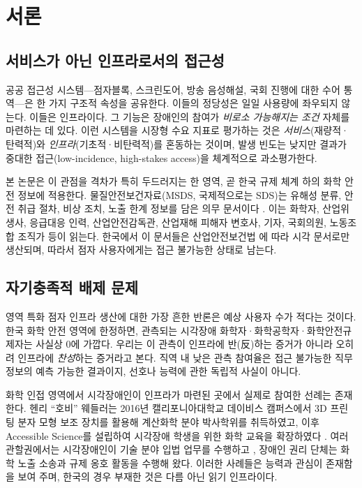 \documentclass[journal]{IEEEtran}
\begin{document}
\section{서론}
\label{sec:introduction}

\subsection{서비스가 아닌 인프라로서의 접근성}

공공 접근성 시스템---점자블록, 스크린도어, 방송 음성해설, 국회 진행에 대한 수어 통역---은 한 가지 구조적 속성을 공유한다. 이들의 정당성은 일일 사용량에 좌우되지 않는다. 이들은 인프라이다. 그 기능은 장애인의 참여가 \emph{비로소 가능해지는 조건} 자체를 마련하는 데 있다. 이런 시스템을 시장형 수요 지표로 평가하는 것은 \emph{서비스}(재량적·탄력적)와 \emph{인프라}(기초적·비탄력적)를 혼동하는 것이며, 발생 빈도는 낮지만 결과가 중대한 접근(low-incidence, high-stakes access)을 체계적으로 과소평가한다.

본 논문은 이 관점을 격차가 특히 두드러지는 한 영역, 곧 한국 규제 체계 하의 화학 안전 정보에 적용한다. 물질안전보건자료(MSDS, 국제적으로는 SDS)는 유해성 분류, 안전 취급 절차, 비상 조치, 노출 한계 정보를 담은 의무 문서이다 \cite{kosha_act}. 이는 화학자, 산업위생사, 응급대응 인력, 산업안전감독관, 산업재해 피해자 변호사, 기자, 국회의원, 노동조합 조직가 등이 읽는다. 한국에서 이 문서들은 산업안전보건법 \cite{kosha_act}에 따라 시각 문서로만 생산되며, 따라서 점자 사용자에게는 접근 불가능한 상태로 남는다.

\subsection{자기충족적 배제 문제}

영역 특화 점자 인프라 생산에 대한 가장 흔한 반론은 예상 사용자 수가 적다는 것이다. 한국 화학 안전 영역에 한정하면, 관측되는 시각장애 화학자·화학공학자·화학안전규제자는 사실상 0에 가깝다. 우리는 이 관측이 인프라에 반(反)하는 증거가 아니라 오히려 인프라에 \emph{찬성}하는 증거라고 본다. 직역 내 낮은 관측 참여율은 접근 불가능한 직무 정보의 예측 가능한 결과이지, 선호나 능력에 관한 독립적 사실이 아니다.

화학 인접 영역에서 시각장애인이 인프라가 마련된 곳에서 실제로 참여한 선례는 존재한다. 헨리 ``호비'' 웨들러는 2016년 캘리포니아대학교 데이비스 캠퍼스에서 3D 프린팅 분자 모형 보조 장치를 활용해 계산화학 분야 박사학위를 취득하였고, 이후 Accessible Science를 설립하여 시각장애 학생을 위한 화학 교육을 확장하였다 \cite{wedler}. 여러 관할권에서는 시각장애인이 기술 분야 입법 업무를 수행하고 \cite{nfb_legislators}, 장애인 권리 단체는 화학 노출 소송과 규제 옹호 활동을 수행해 왔다. 이러한 사례들은 능력과 관심이 존재함을 보여 주며, 한국의 경우 부재한 것은 다름 아닌 읽기 인프라이다.
\end{document}
